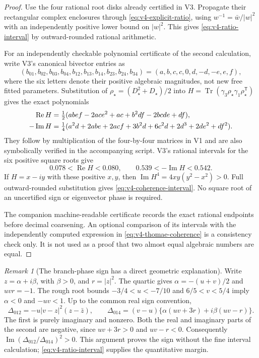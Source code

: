 \documentclass[11pt]{article}
\theoremstyle{definition}
\theoremstyle{remark}
\newtheorem{remark}[remark]{Remark}
\newcommand{\Tr}{\operatorname{Tr}}
\begin{document}
\begin{proof}
Use the four rational root disks already certified in V3. Propagate their
rectangular complex enclosures through \eqref{eq:v4-explicit-ratio}, using
$w^{-1}=\bar w/|w|^2$ with an independently positive lower bound on
$|w|^2$. This gives \eqref{eq:v4-ratio-interval} by outward-rounded
rational arithmetic.

For an independently checkable polynomial certificate of the second
calculation, write V3's canonical bivector entries as
\[
 (b_{01},b_{02},b_{03},b_{04},b_{12},b_{13},b_{14},b_{23},b_{24},b_{34})
 =(a,b,c,c,0,d,-d,-e,e,f),
\]
where the six letters denote their positive algebraic magnitudes, not new
free fitted parameters. Substitution of
$\rho_\star=(D_\star^2+D_\star)/2$ into
$H=\Tr(\gamma_3\rho_\star\gamma_1\rho_\star^{\mathsf T})$ gives the exact
polynomials
\begin{align}
 \operatorname{Re}H
 &=\tfrac12(abe f-2ace^2+ac+b^2df-2bcde+df),\notag\\
 -\operatorname{Im}H
 &=\tfrac14(a^2d+2abe+2acf+3b^2d+6c^2d
                    +2d^3+2de^2+df^2).
 \label{eq:v4-H-polynomials}
\end{align}
They follow by multiplication of the four-by-four matrices in V1 and are
also symbolically verified in the accompanying script. V3's rational
intervals for the six positive square roots give
\[
 0.078<\operatorname{Re}H<0.080,
 \qquad 0.539<-\operatorname{Im}H<0.542.
\]
If $H=x-iy$ with these positive $x,y$, then
$\operatorname{Im}H^4=4xy(y^2-x^2)>0$. Full outward-rounded substitution
gives \eqref{eq:v4-coherence-interval}. No square root of an uncertified
sign or eigenvector phase is required.

The companion machine-readable certificate records the exact rational
endpoints before decimal coarsening. An optional comparison of its intervals
with the independently computed expression in
\eqref{eq:v4-thomae-coherence} is a consistency check only. It is not used
as a proof that two almost equal algebraic numbers are equal.
\end{proof}

\begin{remark}[The branch-phase sign has a direct geometric explanation]
Write $z=\alpha+i\beta$, with $\beta>0$, and $r=|z|^2$. The quartic gives
$\alpha=-(u+v)/2$ and $uvr=-1$. The rough root bounds
$-3/4<u<-7/10$ and $6/5<v<5/4$ imply $\alpha<0$ and $-uv<1$.
Up to the common real sign convention,
\[
 \Delta_{012}=-u|v-z|^2(z-\bar z),\qquad
 \Delta_{014}=(v-u)\{\alpha(uv+3r)+i\beta(uv-r)\}.
\]
The first is purely imaginary and nonzero. Both the real and imaginary
parts of the second are negative, since $uv+3r>0$ and $uv-r<0$.
Consequently $\operatorname{Im}(\Delta_{012}/\Delta_{014})^2>0$.
This argument proves the sign without the fine interval calculation;
\eqref{eq:v4-ratio-interval} supplies the quantitative margin.
\end{remark}
\end{document}
